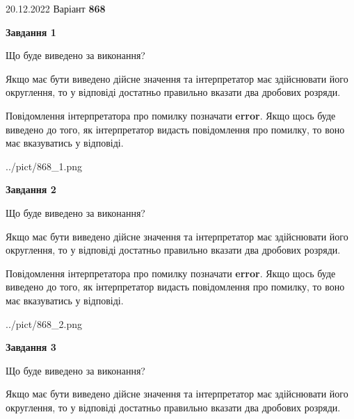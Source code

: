 \documentclass[12pt, ukrainian]{article}
\begin{document}
{20.12.2022 Варіант \No \textbf { 868 }\par}
{
\begin {Large}

{\begin {center}\textbf{Завдання 1}\end {center}}\par
Що буде виведено за виконання? \par

Якщо має бути виведено дійсне значення та інтерпретатор має здійснювати його округлення, 
то у відповіді достатньо правильно вказати два дробових розряди.

Повідомлення інтерпретатора про помилку позначати \textbf{error}.
Якщо щось буде виведено до того, як інтерпретатор видасть повідомлення про помилку, 
то воно має вказуватись у відповіді. \par

\begin{center}
	{../pict/868_1.png}
\end{center}
\newpage

{\begin {center}\textbf{Завдання 2}\end {center}}\par
Що буде виведено за виконання? \par

Якщо має бути виведено дійсне значення та інтерпретатор має здійснювати його округлення, 
то у відповіді достатньо правильно вказати два дробових розряди.

Повідомлення інтерпретатора про помилку позначати \textbf{error}.
Якщо щось буде виведено до того, як інтерпретатор видасть повідомлення про помилку, 
то воно має вказуватись у відповіді. \par

\begin{center}
	{../pict/868_2.png}
\end{center}
\newpage

{\begin {center}\textbf{Завдання 3}\end {center}}\par
Що буде виведено за виконання? \par

Якщо має бути виведено дійсне значення та інтерпретатор має здійснювати його округлення, 
то у відповіді достатньо правильно вказати два дробових розряди.


\end{Large}}
\end{document}
